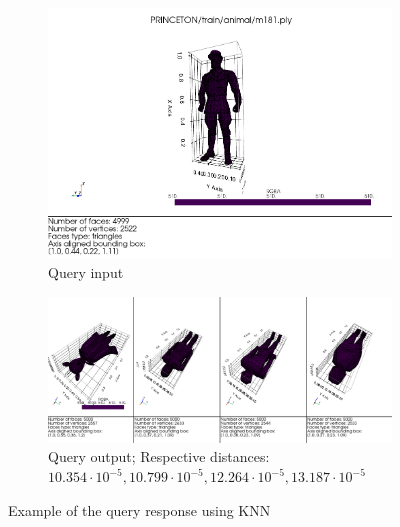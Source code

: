 \begin{figure}[H]
    \begin{subfigure}[b]{0.3\textwidth}
        \includegraphics[width=\textwidth]{assets/queries/human/input.png}
        \caption{Query input}
        \label{fig:query-input-knn-3}
    \end{subfigure}
    \hfill
    \begin{subfigure}[b]{0.65\textwidth}
        \includegraphics[width=\textwidth]{assets/queries/human/output.png}
        \caption{Query output; Respective distances: $10.354\cdot10^{-5}, 10.799\cdot10^{-5}, 12.264\cdot10^{-5}, 13.187\cdot10^{-5}$}
        \label{fig:query-output-knn-3}
    \end{subfigure}
    \hfill
    
    \caption{Example of the query response using KNN}
    \label{fig:query-response-example}
\end{figure}


